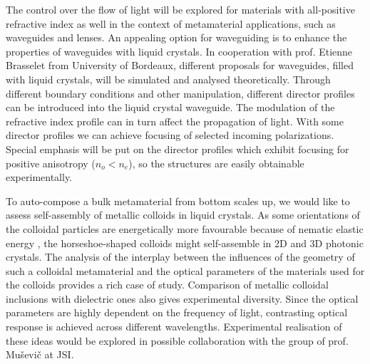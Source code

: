 \documentclass[a4paper,11pt]{article}
\begin{document}
The control over the flow of light will be explored for materials with all-positive refractive index as well in the context of metamaterial applications, such as waveguides and lenses. 
An appealing option for waveguiding is to enhance the properties of waveguides with liquid crystals. 
In cooperation with prof. Etienne Brasselet from University of Bordeaux, different proposals for waveguides, filled with liquid crystals, will be simulated and analysed theoretically. 
Through different boundary conditions and other manipulation, different director profiles can be introduced into the liquid crystal waveguide. 
The modulation of the refractive index profile can in turn affect the propagation of light. 
With some director profiles we can achieve focusing of selected incoming polarizations.
Special emphasis will be put on the director profiles which exhibit focusing for positive anisotropy ($n_{o} < n_e$), so the structures are easily obtainable experimentally. 




To auto-compose a bulk metamaterial from bottom scales up, we would like to assess self-assembly of metallic colloids in liquid crystals.
As some orientations of the colloidal particles are energetically more favourable because of nematic elastic energy \cite{smalyukh-2009-assembly,musevic-2013-assembly}, the horseshoe-shaped colloids might self-assemble in 2D and 3D photonic crystals. 
The analysis of the interplay between the influences of the geometry of such a colloidal metamaterial and the optical parameters of the materials used for the colloids provides a rich case of study. 
Comparison of metallic colloidal inclusions with dielectric ones also gives experimental diversity. 
Since the optical parameters are highly dependent on the frequency of light, contrasting optical response is achieved across different wavelengths. 
Experimental realisation of these ideas would be explored in possible collaboration with the group of prof. Muševič at JSI. 
\end{document}
